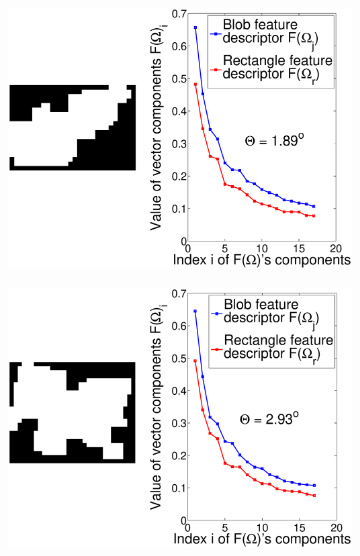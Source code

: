 \documentclass {udthesis}
\begin{document}
\begin{figure} 
  \centering
  \begin{subfigure}[]{0.45\textwidth}
      \includegraphics[width=\textwidth]{best1}
      \caption{}
      \label{subfig:subwaybest1}
  \end{subfigure}
  \begin{subfigure}[]{0.45\textwidth}
      \includegraphics[width=\textwidth]{best2}
      \caption{}
      \label{subfig:subwaybest2}
  \end{subfigure}
  \begin{subfigure}[]{0.45\textwidth}

\end{subfigure}
\end{figure}
\end{document}
